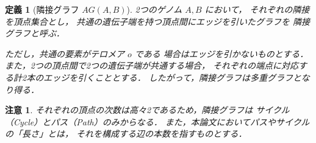 \documentclass[paper=a4,fontsize=11pt,report,oneside]{jlreq}
\newtheorem{definition}[theorem]{定義}
\newtheorem{remark}[theorem]{注意}
\begin{document}
\begin{definition}[隣接グラフ $AG(A,B)$]
2つのゲノム $A, B$ において，
それぞれの隣接を頂点集合とし，
共通の遺伝子端を持つ頂点間にエッジを引いたグラフを
隣接グラフと呼ぶ．

ただし，共通の要素がテロメア $o$ である
場合はエッジを引かないものとする．
また，2つの頂点間で2つの遺伝子端が共通する場合，
それぞれの端点に対応する計2本のエッジを引くこととする．
したがって，隣接グラフは多重グラフとなり得る．

\end{definition}

\begin{remark}
それぞれの頂点の次数は高々2であるため，隣接グラフは
サイクル（Cycle）とパス（Path）のみからなる．
また，本論文においてパスやサイクルの「長さ」とは，
それを構成する辺の本数を指すものとする．
\end{remark}
\end{document}

